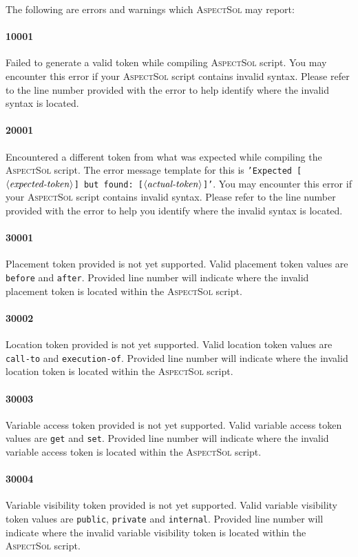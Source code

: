 \documentclass{article}
\newcommand{\AspectSol}{\textsc{AspectSol}\xspace}
\newcommand{\variable}[1]{\ensuremath{\langle\textrm{\textit{#1}}\rangle}}
\begin{document}
The following are errors and warnings which \AspectSol may report:

\paragraph{10001} Failed to generate a valid token while compiling \AspectSol script. You may encounter this error if your \AspectSol script contains invalid syntax. Please refer to the line number provided with the error to help identify where the invalid syntax is located.

\paragraph{20001} Encountered a different token from what was expected while compiling the \AspectSol script. The error message template for this is \texttt{'Expected [\variable{expected-token}] but found: [\variable{actual-token}]'}. You may encounter this error if your \AspectSol script contains invalid syntax. Please refer to the line number provided with the error to help you identify where the invalid syntax is located.

\paragraph{30001} Placement token provided is not yet supported. Valid placement token values are \texttt{before} and \texttt{after}. Provided line number will indicate where the invalid placement token is located within the \AspectSol script.

\paragraph{30002} Location token provided is not yet supported. Valid location token values are \texttt{call-to} and \texttt{execution-of}. Provided line number will indicate where the invalid location token is located within the \AspectSol script.

\paragraph{30003} Variable access token provided is not yet supported. Valid variable access token values are \texttt{get} and \texttt{set}. Provided line number will indicate where the invalid variable access token is located within the \AspectSol script.

\paragraph{30004} Variable visibility token provided is not yet supported. Valid variable visibility token values are \texttt{public}, \texttt{private} and \texttt{internal}. Provided line number will indicate where the invalid variable visibility token is located within the \AspectSol script.
\end{document}
